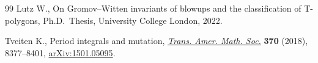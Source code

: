\documentclass[pdftex]{sigma}
\numberwithin{equation}{section}
\begin{document}
\begin{thebibliography}{99}
Lutz W., On {G}romov--{W}itten invariants of blowups and the classification of
 {T}-polygons, Ph.D.~Thesis, {U}niversity College London, 2022.

Tveiten K., Period integrals and mutation, \href{https://doi.org/10.1090/tran/7320}{\textit{Trans. Amer. Math. Soc.}}
 \textbf{370} (2018), 8377--8401, \href{https://arxiv.org/abs/1501.05095}{arXiv:1501.05095}.

\end{thebibliography}\LastPageEnding
\end{document}
